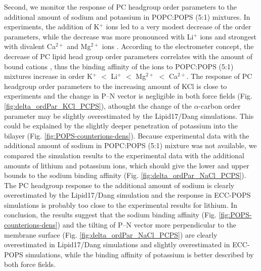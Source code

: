 \documentclass[journal=jpcbfk,manuscript=article]{achemso}
\begin{document}
Second, we monitor the response of PC headgroup order parameters to the additional
amount of sodium and potassium in POPC:POPS (5:1) mixtures.
In experiments, the addition of K$^+$ ions led to a very modest decrease of the order parameters,
while the decrease was more pronounced with Li$^+$ ions and strongest with divalent Ca$^{2+}$ and Mg$^{2+}$ ions \cite{roux90}.
According to the electrometer concept, the decrease of PC lipid head group order parameters
correlates with the amount of bound cations \cite{akutsu81,altenbach84,seelig87,roux90,catte16,nmrlipids_proj4},
thus the binding affinity of the ions to POPC:POPS (5:1) mixtures increase in order K$^{+}$ $<$ Li$^{+}$  $<$ Mg$^{2+}$  $<$ Ca$^{2+}$.
The response of PC headgroup order parameters to the increasing amount of KCl is close to experiments
and the change in P--N vector is negligible in both force fields (Fig. \ref{fig:delta_ordPar_KCl_PCPS}), athought the change of the $\alpha$-carbon
order parameter may be slightly overestimated by the Lipid17/Dang simulations. This could be
explained by the slightly deeper penetration of potassium into the bilayer (Fig. \ref{fig:POPS-counterions-dens}).
Because experimental data with the additional amount of sodium in POPC:POPS (5:1) mixture was not available,
we compared the simulation results to the experimental data with the additional amounts of
lithium and potassium ions, which should give the lower and upper bounds to the sodium binding
affinity (Fig. \ref{fig:delta_ordPar_NaCl_PCPS}). The PC headgroup response to the additional
amount of sodium is clearly overestimated by the Lipid17/Dang simulation and
the response in ECC-POPS simulations is probably too close to the experimental results for lithium.
In conclusion, the results suggest that the sodium binding affinity (Fig. \ref{fig:POPS-counterions-dens}) and
the tilting of P--N vector more perpendicular to the membrane surface (Fig. \ref{fig:delta_ordPar_NaCl_PCPS})
are clearly overestimated in Lipid17/Dang simulations and slightly overestimated in ECC-POPS simulations,
while 
the binding affinity of potassium is better described by both force fields.

\end{document}
